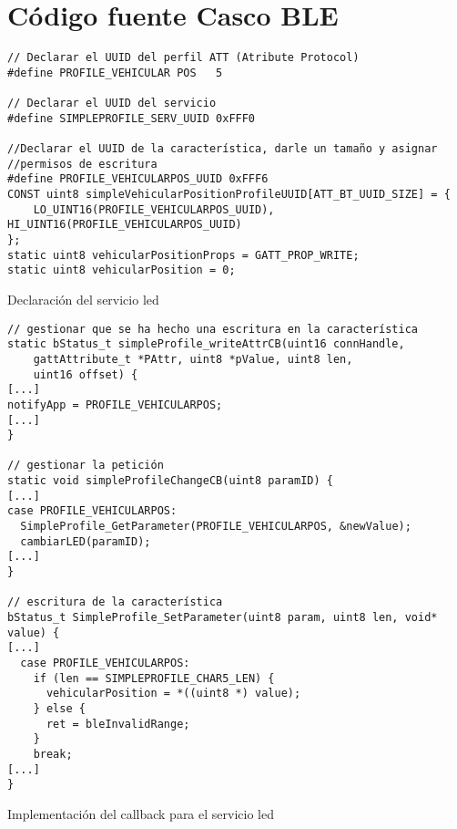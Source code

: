 \section{Código fuente Casco BLE}
\begin{listing}
\begin{minipage}{.4\textwidth}
\begin{verbatim}
// Declarar el UUID del perfil ATT (Atribute Protocol)
#define PROFILE_VEHICULAR POS   5

// Declarar el UUID del servicio
#define SIMPLEPROFILE_SERV_UUID 0xFFF0

//Declarar el UUID de la característica, darle un tamaño y asignar
//permisos de escritura
#define PROFILE_VEHICULARPOS_UUID 0xFFF6
CONST uint8 simpleVehicularPositionProfileUUID[ATT_BT_UUID_SIZE] = {
	LO_UINT16(PROFILE_VEHICULARPOS_UUID), HI_UINT16(PROFILE_VEHICULARPOS_UUID)
};
static uint8 vehicularPositionProps = GATT_PROP_WRITE;
static uint8 vehicularPosition = 0;

\end{verbatim}
\end{minipage}
\caption{Declaración del servicio led}\label{alg:mota1}
\end{listing}

\begin{listing}
\begin{minipage}{.4\textwidth}
\begin{verbatim}
// gestionar que se ha hecho una escritura en la característica
static bStatus_t simpleProfile_writeAttrCB(uint16 connHandle,
    gattAttribute_t *PAttr, uint8 *pValue, uint8 len,
    uint16 offset) {
[...]
notifyApp = PROFILE_VEHICULARPOS;
[...]
}

// gestionar la petición
static void simpleProfileChangeCB(uint8 paramID) {
[...]
case PROFILE_VEHICULARPOS:
  SimpleProfile_GetParameter(PROFILE_VEHICULARPOS, &newValue);
  cambiarLED(paramID);
[...]
}

// escritura de la característica
bStatus_t SimpleProfile_SetParameter(uint8 param, uint8 len, void* value) {
[...]
  case PROFILE_VEHICULARPOS:
    if (len == SIMPLEPROFILE_CHAR5_LEN) {
      vehicularPosition = *((uint8 *) value);
    } else {
      ret = bleInvalidRange;
    }
    break;
[...]
}
\end{verbatim}
\end{minipage}
\caption{Implementación del callback para el servicio led}\label{alg:mota2}
\end{listing}
